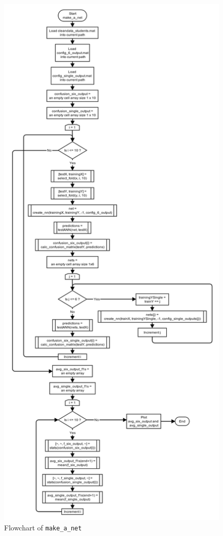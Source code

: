\documentclass[10pt,a4paper]{article}
\begin{document}
\begin{figure}[!ht]
	\centering
	\includegraphics[height=\textheight, width=\textwidth]{images/flow_chart/make_a_net.png}
	\caption{Flowchart of \tt{make\_a\_net}}
	\label{fig:make_a_net}
\end{figure}
\end{document}
